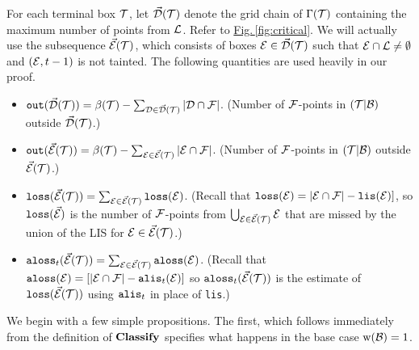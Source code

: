 \documentclass{acmsmall}
\newcommand{\cB}{{\cal B}}
\newcommand{\cC}{{\cal C}}
\newcommand{\cD}{{\cal D}}
\newcommand{\cE}{{\cal E}}
\newcommand{\cF}{{\cal F}}
\newcommand{\cL}{{\cal L}}
\newcommand{\cT}{{\cal T}}
\newcommand{\Fig}[1]{\hyperref[fig:#1]{Fig.\,\ref*{fig:#1}}} %
\newcommand{\lis}{{\tt lis}}
\newcommand{\loss}{{\tt loss}}
\newcommand{\alis}{{\tt alis}}
\newcommand{\aloss}{{\tt aloss}}
\newcommand{\outside}{{\tt out}}
\newcommand{\kappaest}{\widehat{\kappa}}
\newcommand{\width}{{\bf {\rm  w}}}
\newcommand{\classify}{{\rm {\bf Classify}}}
\begin{document}
For each terminal box $\cT$, let $\vec{\cD}(\cT)$ denote the grid chain of $\Gamma(\cT)$ containing the maximum number
of points from $\cL$. Refer to \Fig{critical}. 
We will actually use the subsequence $\vec{\cE}(\cT)$, which consists of 
boxes $\cE \in \vec{\cD}(\cT)$ such that $\cE \cap \cL \neq \emptyset$ and $(\cE,t-1)$ is not tainted.
The following quantities are used heavily in our proof.
%
%
%
\begin{itemize}
\item $\outside(\vec{\cD}(\cT)) = \beta(\cT) - \sum_{\cD \in \vec{\cD}(\cT)} |\cD \cap \cF|$.
(Number of $\cF$-points in $(\cT|\cB)$ outside $\vec{\cD}(\cT)$.)
\item $\outside(\vec{\cE}(\cT)) = \beta(\cT) - \sum_{\cE \in \vec{\cE}(\cT)} |\cE \cap \cF|$.
(Number of $\cF$-points in $(\cT|\cB)$ outside $\vec{\cE}(\cT)$.)
\item $\loss(\vec{\cE}(\cT)) = \sum_{\cE \in \vec{\cE}(\cT)} \loss(\cE)$.  (Recall that  $\loss(\cE)=|\cE \cap \cF| - \lis(\cE)]$, so $\loss(\vec{\cE})$ is the number
of $\cF$-points from $\bigcup_{\cE \in \vec{\cE}(\cT)} \cE$  that are missed by the union of
the  LIS  for $\cE \in \vec{\cE}(\cT)$.)
\item $\aloss_t(\vec{\cE}(\cT)) = \sum_{\cE \in \vec{\cE}(\cT)} \aloss(\cE)$. (Recall that  
$\aloss(\cE)=[|\cE \cap \cF| - \alis_t(\cE)]$ so $\aloss_t(\vec{\cE}(\cT))$ is the
estimate of $\loss(\vec{\cE}(\cT))$ using $\alis_t$ in place of \lis.)
\end{itemize}
%
%
We begin with a few simple propositions.  The first, which follows immediately from the definition
of $\classify$ specifies what happens in the base case $\width(\cB)=1$.
\end{document}
